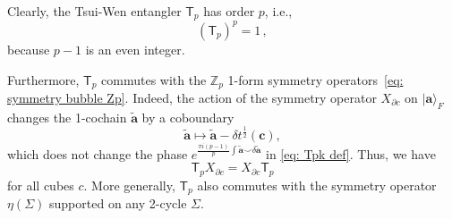 \documentclass[aps,twocolumn,prx,floatfix,preprintnumbers, nofootinbib,10pt]{revtex4-2}
\numberwithin{equation}{section}
\theoremstyle{definition}
\theoremstyle{remark}
\theoremstyle{claim}
\def\ket#1{{|{#1}\rangle}}
\renewcommand{\sf}[1]{\mathsf{#1}}
\begin{document}
Clearly, the Tsui-Wen entangler $\sf{T}_p$ has order $p$, i.e.,
\begin{equation}
\left( \sf{T}_p \right)^p = 1 \,,
\end{equation}
because $p - 1$ is an even integer.

Furthermore, $\sf{T}_p$ commutes with the $\mathbb{Z}_p$ 1-form symmetry operators~\eqref{eq: symmetry bubble Zp}.
Indeed, the action of the symmetry operator $X_{\partial c}$ on $\ket{\bm{a}}_F$ changes the 1-cochain $\tilde{\bm{a}}$ by a coboundary
\begin{equation}
\tilde{\bm{a}} \mapsto \tilde{\bm{a}} -\delta t^{\frac{1}{2}}(\bm{c}),
\end{equation}
which does not change the phase $e^{\frac{\pi i (p - 1)}{p} \int \tilde{\bm{a}} \smile \delta \tilde{\bm{a}}}$ in \eqref{eq: Tpk def}.
Thus, we have
\begin{equation}
\sf{T}_p X_{\partial c} = X_{\partial c} \sf{T}_p
\label{eq: T pk sym}
\end{equation}
for all cubes $c$.
More generally, $\sf{T}_p$ also commutes with the symmetry operator $\eta(\Sigma)$ supported on any 2-cycle $\Sigma$.
\end{document}
